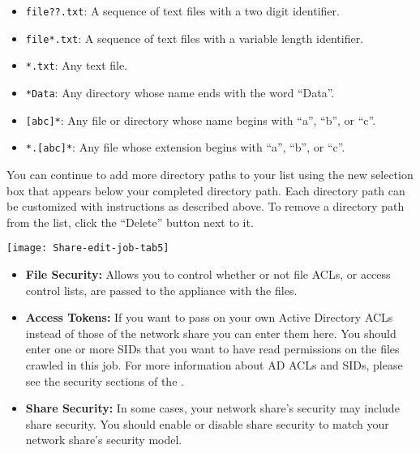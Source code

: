 \begin{itemize}
\begin{itemize}

\item \texttt{file??.txt}: A sequence of text files with a two digit
identifier.

\item \texttt{file*.txt}: A sequence of text files with a variable
length identifier.

\item \texttt{*.txt}: Any text file.

\item \texttt{*Data}: Any directory whose name ends with the word
``Data''.

\item \texttt{[abc]*}: Any file or directory whose name begins with
``a'', ``b'', or ``c''.

\item \texttt{*.[abc]*}: Any file whose extension begins with ``a'',
``b'', or ``c''.

\end{itemize}

You can continue to add more directory paths to your list using the
new selection box that appears below your completed directory
path. Each directory path can be customized with instructions as
described above. To remove a directory path from the list, click the
``Delete'' button next to it.

\end{itemize}

\texttt{[image: Share-edit-job-tab5]}

\begin{itemize}

\item \textbf{File Security:}  Allows you to control whether or not file ACLs,
or access control lists, are passed to the appliance with the files.

\item \textbf{Access Tokens:} If you want to pass on your own Active
Directory ACLs instead of those of the network share you can enter
them here. You should enter one or more SIDs that you want to have
read permissions on the files crawled in this job. For more
information about AD ACLs and SIDs, please see the security sections
of the .


\item \textbf{Share Security:} In some cases, your network share's
security may include share security. You should enable or disable
share security to match your network share's security model.

\end{itemize}

